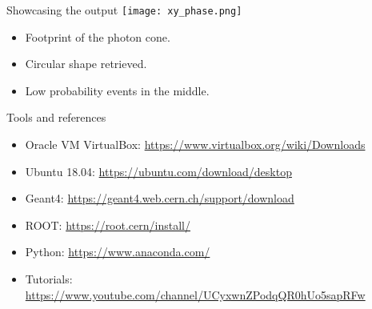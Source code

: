 \documentclass[11pt]{beamer}
\begin{document}
\begin{frame}{Showcasing the output}
    \centering
    \texttt{[image: xy\_phase.png]}
    \begin{itemize}
        \item<tri@1-> Footprint of the photon cone.
        \vspace{0.2 cm}
        \item<tri@1-> Circular shape retrieved.
        \vspace{0.2 cm}
        \item<tri@1-> Low probability events in the middle.
    \end{itemize}
    
\end{frame}

\begin{frame}{Tools and references}
    \begin{itemize}
        \item<tri@1-> Oracle VM VirtualBox: \url{https://www.virtualbox.org/wiki/Downloads}
        \vspace{0.2 cm}
        \item<tri@1-> Ubuntu 18.04: \url{https://ubuntu.com/download/desktop}
        \vspace{0.2 cm}
        \item<tri@1-> Geant4: \url{https://geant4.web.cern.ch/support/download}
        \vspace{0.2 cm}
        \item<tri@1-> ROOT: \url{https://root.cern/install/}
        \vspace{0.2 cm}
        \item<tri@1-> Python: \url{https://www.anaconda.com/}
        \vspace{0.2 cm}
        \item<tri@1-> Tutorials: \url{https://www.youtube.com/channel/UCyxwnZPodqQR0hUo5sapRFw}
    \end{itemize}




    
\end{frame}
\end{document}
